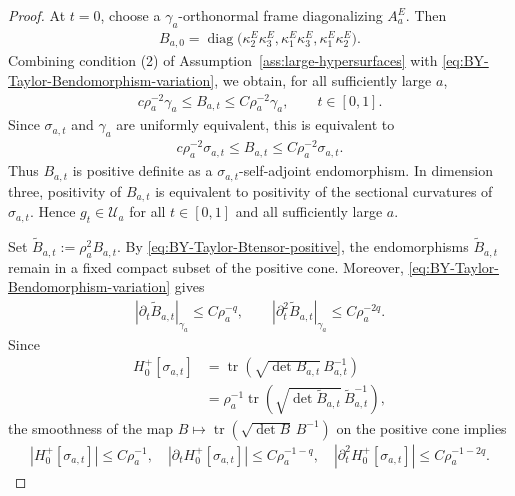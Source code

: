 \documentclass[10pt]{amsart}
\theoremstyle{plain}
\theoremstyle{remark}
\begin{document}
\begin{proof}
		At $t=0$, choose a $\gamma_a$-orthonormal frame diagonalizing $A_a^E$.
		Then
		\begin{align*}
			B_{a,0}
			=
			\operatorname{diag}
			\bigl(
			\kappa_2^E\kappa_3^E,
			\kappa_1^E\kappa_3^E,
			\kappa_1^E\kappa_2^E
			\bigr).
		\end{align*}
		Combining condition \textup{(2)} of Assumption~\ref{ass:large-hypersurfaces} with \eqref{eq:BY-Taylor-Bendomorphism-variation}, we obtain, for all sufficiently large $a$,
		\begin{align}\label{eq:BY-Taylor-Btensor-positive}
			c\rho_a^{-2}\gamma_a
			\leq
			B_{a,t}
			\leq
			C\rho_a^{-2}\gamma_a,
			\qquad
			t\in[0,1].
		\end{align}
		Since $\sigma_{a,t}$ and $\gamma_a$ are uniformly equivalent, this is
		equivalent to
		\begin{align*}
			c\rho_a^{-2}\sigma_{a,t}
			\leq
			B_{a,t}
			\leq
			C\rho_a^{-2}\sigma_{a,t}.
		\end{align*}
		Thus $B_{a,t}$ is positive definite as a $\sigma_{a,t}$-self-adjoint
		endomorphism. In dimension three, positivity of $B_{a,t}$ is equivalent to
		positivity of the sectional curvatures of $\sigma_{a,t}$. Hence
		$g_t\in\mathcal U_a$ for all $t\in[0,1]$ and all sufficiently large $a$.
		
		Set $\widetilde B_{a,t}:=\rho_a^2B_{a,t}$. By \eqref{eq:BY-Taylor-Btensor-positive}, the endomorphisms
		$\widetilde B_{a,t}$ remain in a fixed compact subset of the positive cone.
		Moreover,
		\eqref{eq:BY-Taylor-Bendomorphism-variation} gives
		\begin{align*}
			|\partial_t\widetilde B_{a,t}|_{\gamma_a}
			\leq
			C\rho_a^{-q},
			\qquad
			|\partial_t^2\widetilde B_{a,t}|_{\gamma_a}
			\leq
			C\rho_a^{-2q}.
		\end{align*}
		Since
		\begin{align*}
			H_0^+[\sigma_{a,t}]
			&=
			\operatorname{tr}
			\left(
			\sqrt{\det B_{a,t}}\,
			B_{a,t}^{-1}
			\right)
			\\
			&=
			\rho_a^{-1}
			\operatorname{tr}
			\left(
			\sqrt{\det\widetilde B_{a,t}}\,
			\widetilde B_{a,t}^{-1}
			\right),
		\end{align*}
		the smoothness of the map
		$B\mapsto\operatorname{tr}(\sqrt{\det B}\,B^{-1})$ on the positive cone
		implies
		\begin{align}\label{eq:BY-Taylor-reference-H-variation}
			|H_0^+[\sigma_{a,t}]|
			\leq
			C\rho_a^{-1},
			\quad
			|\partial_tH_0^+[\sigma_{a,t}]|
			\leq
			C\rho_a^{-1-q},
			\quad
			|\partial_t^2H_0^+[\sigma_{a,t}]|
			\leq
			C\rho_a^{-1-2q}.
		\end{align}
		

\end{proof}
\end{document}

